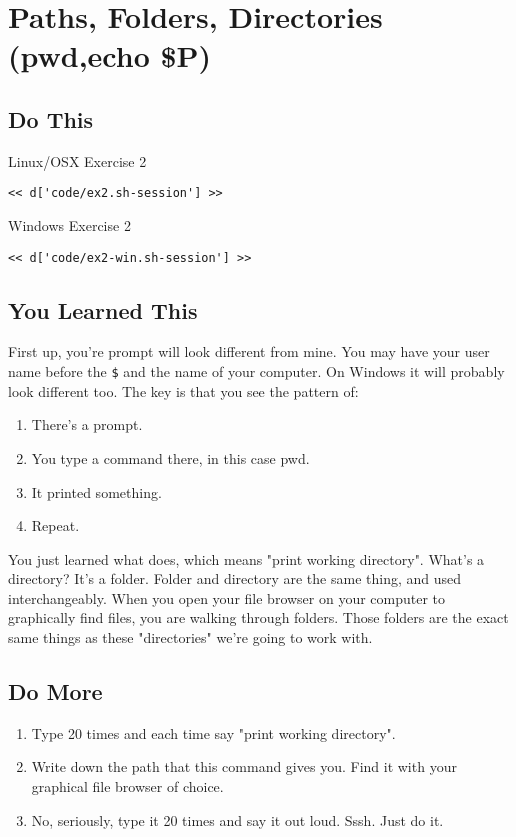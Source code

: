 \chapter{Paths, Folders, Directories (pwd,echo \$P)}

\section{Do This}

\begin{code}{Linux/OSX Exercise 2}
\begin{Verbatim}
<< d['code/ex2.sh-session'] >>
\end{Verbatim}
\end{code}

\begin{code}{Windows Exercise 2}
\begin{Verbatim}
<< d['code/ex2-win.sh-session'] >>
\end{Verbatim}
\end{code}

\section{You Learned This}

First up, you're prompt will look different from mine.  You may have your user
name before the \verb|$| and the name of your computer.  On Windows it will
probably look different too.  The key is that you see the pattern of:

\begin{enumerate}
\item There's a prompt.
\item You type a command there, in this case pwd.
\item It printed something.
\item Repeat.
\end{enumerate}

You just learned what  does, which means "print working
directory".  What's a directory?  It's a folder.  Folder and directory are the
same thing, and used interchangeably.  When you open your file browser on your
computer to graphically find files, you are walking through folders.  Those
folders are the exact same things as these "directories" we're going to work
with.

\section{Do More}

\begin{enumerate}
\item Type  20 times and each time say "print working directory".
\item Write down the path that this command gives you.  Find it with your 
    graphical file browser of choice.
\item No, seriously, type it 20 times and say it out loud.  Sssh.  Just do it.
\end{enumerate}

